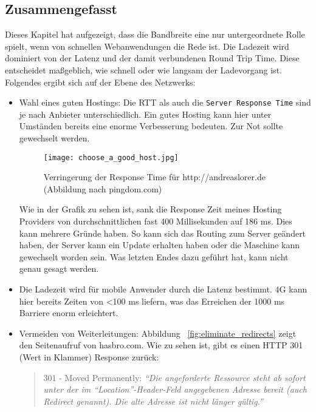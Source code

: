 
	\subsection{Zusammengefasst} %
	\label{sub:zusammengefasst}
		Dieses Kapitel hat aufgezeigt, dass die Bandbreite eine nur untergeordnete Rolle spielt, wenn von schnellen Webanwendungen die Rede ist. Die Ladezeit wird dominiert von der Latenz und der damit verbundenen Round Trip Time. Diese entscheidet maßgeblich, wie schnell oder wie langsam der Ladevorgang ist.
		Folgendes ergibt sich auf der Ebene des Netzwerks:
		\begin{itemize}
			\item Wahl eines guten Hostings: Die RTT als auch die \texttt{Server Response Time} sind je nach Anbieter unterschiedlich. Ein gutes Hosting kann hier unter Umständen bereits eine enorme Verbesserung bedeuten. Zur Not sollte gewechselt werden.

			\begin{figure}[htbp]
				\begin{center}
					\texttt{[image: choose\_a\_good\_host.jpg]}
					\caption{Verringerung der Response Time für http://andreaslorer.de (Abbildung nach pingdom.com)}
					\label{fig:choose_a_good_host}
				\end{center}
			\end{figure}
			
			Wie in der Grafik zu sehen ist, sank die Response Zeit meines Hosting Providers von durchschnittlichen fast 400 Millisekunden auf 186 ms. Dies kann mehrere Gründe haben. So kann sich das Routing zum Server geändert haben, der Server kann ein Update erhalten haben oder die Maschine kann gewechselt worden sein. Was letzten Endes dazu geführt hat, kann nicht genau gesagt werden.
			\item Die Ladezeit wird für mobile Anwender durch die Latenz bestimmt. 4G kann hier bereits Zeiten von <100 ms liefern, was das Erreichen der 1000 ms Barriere enorm erleichtert.

			\item Vermeiden von Weiterleitungen: Abbildung ~\ref{fig:eliminate_redirects} zeigt den Seitenaufruf von hasbro.com. Wie zu sehen ist, gibt es einen HTTP 301 (Wert in Klammer) Response zurück: 

			\begin{quote}
				301 - Moved Permanently: \textit{"`Die angeforderte Ressource steht ab sofort unter der im "`Location"'-Header-Feld angegebenen Adresse bereit (auch Redirect genannt). Die alte Adresse ist nicht länger gültig."'} \autocite{wikipediaHTTP}
			\end{quote}


\end{itemize}
